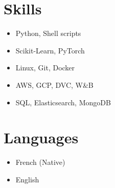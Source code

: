 \documentclass[a4paper,10pt]{article}
\begin{document}
\begin{adjustbox}{valign=t}
\begin{minipage}{0.3\textwidth}
        \section*{Skills}
        \raggedright
        \begin{itemize}
            \itemsep0em
            \item Python, Shell scripts
            \item Scikit-Learn, PyTorch
            \item Linux, Git, Docker
            \item AWS, GCP, DVC, W\&B
            \item SQL, Elasticsearch, MongoDB
        \end{itemize}
        \vspace{-.5cm}
        \section*{Languages}
        \raggedright
        \begin{itemize}
            \itemsep0em
            \item French (Native)
            \item English
        \end{itemize}
        \vspace{-.5cm}
    \end{minipage}
\end{adjustbox}
\hfill
\begin{adjustbox}{valign=t}
    \begin{minipage}{0.02\textwidth}
        \MyVerticalRule
    \end{minipage}
\end{adjustbox}
\hfill
\end{document}

